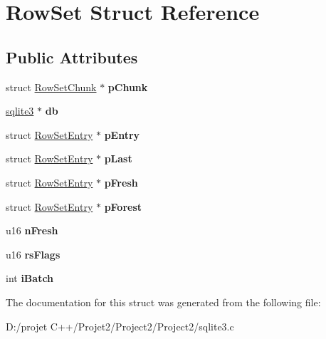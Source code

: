 \hypertarget{struct_row_set}{}\section{Row\+Set Struct Reference}
\label{struct_row_set}
\subsection*{Public Attributes}
\begin{DoxyCompactItemize}
\item 
\mbox{\label{struct_row_set_af064f9ec7b1ba820a3d53622bde9d42f}} 
struct \mbox{\hyperlink{struct_row_set_chunk}{Row\+Set\+Chunk}} $\ast$ {\bfseries p\+Chunk}
\item 
\mbox{\label{struct_row_set_a7da847a06c2f90025fbd89c57516c6f6}} 
\mbox{\hyperlink{structsqlite3}{sqlite3}} $\ast$ {\bfseries db}
\item 
\mbox{\label{struct_row_set_a3eccaf69ad7863abae2541a7c0b94e1d}} 
struct \mbox{\hyperlink{struct_row_set_entry}{Row\+Set\+Entry}} $\ast$ {\bfseries p\+Entry}
\item 
\mbox{\label{struct_row_set_a040c4b798e6f20d20aa99a45e93b2079}} 
struct \mbox{\hyperlink{struct_row_set_entry}{Row\+Set\+Entry}} $\ast$ {\bfseries p\+Last}
\item 
\mbox{\label{struct_row_set_a7c4e95bd08ff77135068bb3987be5ca1}} 
struct \mbox{\hyperlink{struct_row_set_entry}{Row\+Set\+Entry}} $\ast$ {\bfseries p\+Fresh}
\item 
\mbox{\label{struct_row_set_abe7ab16fffbe5992f637d6a17c6342ff}} 
struct \mbox{\hyperlink{struct_row_set_entry}{Row\+Set\+Entry}} $\ast$ {\bfseries p\+Forest}
\item 
\mbox{\label{struct_row_set_a0ed2a47d6789a70081f3454ef2604e7f}} 
u16 {\bfseries n\+Fresh}
\item 
\mbox{\label{struct_row_set_abfbd103e329e88d0a09ca5a7c9bbd225}} 
u16 {\bfseries rs\+Flags}
\item 
\mbox{\label{struct_row_set_a90ebc79619b880c1a38b96622ad0ffe0}} 
int {\bfseries i\+Batch}
\end{DoxyCompactItemize}


The documentation for this struct was generated from the following file\+:\begin{DoxyCompactItemize}
\item 
D\+:/projet C++/\+Projet2/\+Project2/\+Project2/sqlite3.\+c\end{DoxyCompactItemize}
